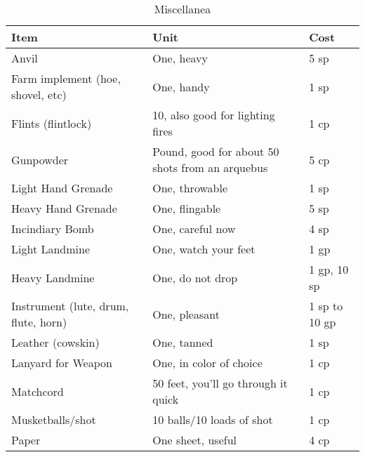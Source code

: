 \documentclass[oneside,11pt,english]{book}
\begin{document}
\begin{table}[hb]
  \centering
  \caption{Miscellanea}
  \label{tab:Miscellanea}
  \begin{tabu} spread 0pt {*{3}{X[-1]}}
    Item                                 & Unit                                            & Cost                   \\\toprule
    Anvil                                & One, heavy                                      & 5 sp                   \\
    Farm implement (hoe, shovel, etc)    & One, handy                                      & 1 sp                   \\
    Flints (flintlock)                   & 10, also good for lighting fires                & 1 cp                   \\
    Gunpowder                            & Pound, good for about 50 shots from an arquebus & 5 cp                   \\
    Light Hand Grenade                   & One, throwable                                  & 1 sp                   \\
    Heavy Hand Grenade                   & One, flingable                                  & 5 sp                   \\
    Incindiary Bomb                      & One, careful now                                & 4 sp                   \\
    Light Landmine                       & One, watch your feet                            & 1 gp                   \\
    Heavy Landmine                       & One, do not drop                                & 1 gp, 10 sp            \\
    Instrument (lute, drum, flute, horn) & One, pleasant                                   & 1 sp to 10 gp          \\
    Leather (cowskin)                    & One, tanned                                     & 1 sp                   \\
    Lanyard for Weapon                   & One, in color of choice                         & 1 cp                   \\
    Matchcord                            & 50 feet, you’ll go through it quick             & 1 cp                   \\
    Musketballs/shot                     & 10 balls/10 loads of shot                       & 1 cp                   \\
    Paper                                & One sheet, useful                               & 4 cp                   \\

\end{tabu}
\end{table}
\end{document}
